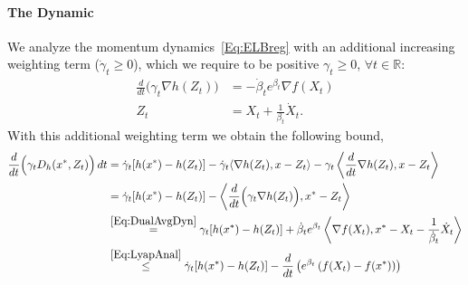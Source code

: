 \documentclass[11pt]{article}
\theoremstyle{plain}
\newcommand{\R}{{\mathbb R}}
\begin{document}
 \paragraph{The Dynamic} We analyze the momentum dynamics~\eqref{Eq:ELBreg} with an additional increasing weighting term ($\dot \gamma_t \geq 0$), which we require to be positive $\gamma_t\geq 0$, $\forall t\in \R$:
 \begin{subequations}\label{Eq:DualAvgDyn}
\begin{align}
\frac{d}{dt}\Big(\gamma_t \nabla h(Z_t)\Big) &= -\dot \beta_t e^{\beta_t}\nabla f(X_t)\\
Z_t &= X_t + \frac{1}{\beta_t} \dot X_t.
\end{align}
\end{subequations}
With this additional weighting term we obtain the following bound, 
\begin{subequations}\label{Eq:Last}
  \begin{align}
 \frac{d}{dt} \Big( \gamma_t D_h(x^\ast,Z_t) \Big) \, dt
&=\dot \gamma_t [h(x^\ast) - h(Z_t)] - \dot \gamma_t \langle\nabla h(Z_t), x - Z_t \rangle-\gamma_t\left \langle \frac{d}{dt} \nabla h(Z_t), x - Z_t\right \rangle \notag\\
&= \dot \gamma_t [h(x^\ast) - h(Z_t)] - \left \langle \frac{d}{dt} \Big(\gamma_t  \nabla h(Z_t)\Big), x^\ast - Z_t \right\rangle \notag\\
&  \overset{\eqref{Eq:DualAvgDyn}}{=}  \gamma_t [h(x^\ast) - h(Z_t)]  +  \dot \beta_t e^{\beta_t} \left\langle \nabla f(X_t), x^\ast - X_t - \frac{1}{\dot \beta_t} \dot X_t\right\rangle \notag\\
& \overset{\eqref{Eq:LyapAnal}}{\leq} \dot \gamma_t [h(x^\ast) - h(Z_t)]   - \frac{d}{dt}\left( e^{\beta_t}\left(f(X_t) - f(x^\ast)\right)\right) 
\end{align}
\end{subequations}
\end{document}
